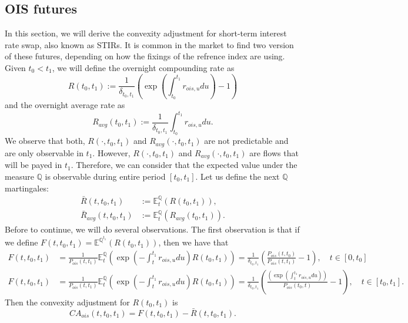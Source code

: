 \documentclass[a4paper,10pt]{article}
\newcommand{\1}{\mathbf{1}}
\begin{document}
\subsection{OIS futures}
In this section, we will derive the convexity adjustment for short-term interest rate swap, also known as STIRs. It is common in the market to find two version of these futures, depending on how the fixings of the refrence index are using. Given $t_0 < t_1$, we will define the overnight compounding rate as
\begin{equation*}
R(t_0,t_1) :=\frac{1}{\delta_{t_0,t_1}} \left(\exp\left(\int_{t_0}^{t_1}r_{ois,u} du \right) - 1\right)
\end{equation*}
and the overnight average rate as
\begin{equation*}
R_{avg}(t_0,t_1) := \frac{1}{\delta_{t_0,t_1}}\int_{t_0}^{t_1}r_{ois,u} du.
\end{equation*}
We observe that both, $R(\cdot,t_0,t_1)$ and $R_{avg}(\cdot,t_0,t_1)$  are not predictable and are only observable in $t_1$. However, 
$R(\cdot,t_0,t_1)$ and $R_{avg}(\cdot,t_0,t_1)$ are flows that will be payed in $t_1$. Therefore, we can consider that the expected value under the measure $\mathbb{Q}$ is observable during entire period $[t_0, t_1]$. Let us define the next $\mathbb{Q}$ martingales:
\begin{align*} 
\bar{R}(t,t_0,t_1) &:= \mathbb{E}_t^{\mathbb{Q}}\left( R(t_0,t_1)  \right), \\
\bar{R}_{avg}(t,t_0,t_1) &:= \mathbb{E}_t^{\mathbb{Q}}\left( R_{avg}(t_0,t_1)  \right).
\end{align*}
Before to continue, we will do several observations. The first observation is that if we define $F(t,t_0,t_1) = \mathbb{E}^{\mathbb{Q}^{t_1}}\left( R(t_0,t_1)\right)$, then we have that
\begin{align*}
F(t,t_0,t_1)&= \frac{1}{P_{ois}(t,t_1)}  \mathbb{E}_{t}^{\mathbb{Q}}\left(\exp\left(-\int_{t}^{t_1} r_{ois,u} du \right) R(t_0,t_1) \right) = \frac{1}{\delta_{t_0,t_1}}\left(\frac{P_{ois}(t,t_0)}{P_{ois}(t,t_1)} - 1\right), \quad t \in [0,t_0] \\
F(t,t_0,t_1)&= \frac{1}{P_{ois}(t,t_1)} \mathbb{E}_{t}^{\mathbb{Q}}\left(\exp\left(-\int_{t}^{t_1} r_{ois,u} du \right) R(t_0,t_1) \right) = \frac{1}{\delta_{t_0,t_1}} \left(\frac{\left( \exp\left(\int_{t}^{t_1}r_{ois,u} du\right)\right)}{P_{ois}(t_0,t)}-1\right), \quad  t \in  [t_0, t_1].
\end{align*}
Then the convexity adjustment for $ R(t_0,t_1)$ is
\begin{equation}\label{R_ois_ca}
CA_{ois}(t,t_0,t_1) = F(t,t_0,t_1) - \bar{R}(t,t_0,t_1).
\end{equation}
\end{document}
